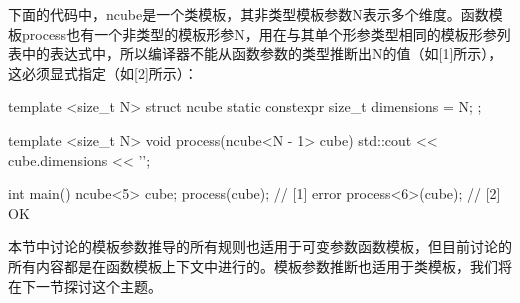 \begin{itemize}
下面的代码中，ncube是一个类模板，其非类型模板参数N表示多个维度。函数模板process也有一个非类型的模板形参N，用在与其单个形参类型相同的模板形参列表中的表达式中，所以编译器不能从函数参数的类型推断出N的值（如[1]所示），这必须显式指定（如[2]所示）：

\begin{cpp}
template <size_t N>
struct ncube
{
	static constexpr size_t dimensions = N;
};

template <size_t N>
void process(ncube<N - 1> cube)
{
	std::cout << cube.dimensions << '\n';
}

int main()
{
	ncube<5> cube;
	process(cube); // [1] error
	process<6>(cube); // [2] OK
}
\end{cpp}
\end{itemize}

本节中讨论的模板参数推导的所有规则也适用于可变参数函数模板，但目前讨论的所有内容都是在函数模板上下文中进行的。模板参数推断也适用于类模板，我们将在下一节探讨这个主题。













































